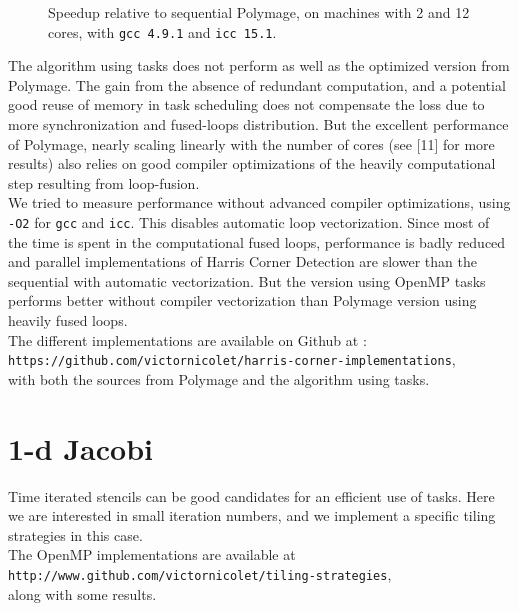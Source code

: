 \documentclass[a4paper,11pt]{article}
\begin{document}
\begin{figure}[h]
  \begin{center}
    
  \end{center}
  \caption{Speedup relative to sequential Polymage, on machines with 2 and 12 cores,
with \texttt{gcc 4.9.1} and \texttt{icc 15.1}.}
  \label{results_hcd}
\end{figure}

The algorithm using tasks does not perform as well as the optimized version from Polymage. 
The gain from the absence of redundant computation, and a potential good reuse
of memory in task scheduling does not compensate the loss due to more synchronization
and fused-loops distribution. But the excellent performance of Polymage, nearly scaling
linearly with the number of cores (see [11] for more results) also relies on good compiler
optimizations of the heavily computational step resulting from loop-fusion.\\
We tried to measure performance without advanced compiler optimizations, using \texttt{-O2} for
\texttt{gcc} and \texttt{icc}. This disables automatic loop vectorization. Since most of the time 
is spent in the computational fused loops, performance is badly reduced and parallel implementations
of Harris Corner Detection are slower than the sequential with automatic vectorization. 
But the version using OpenMP tasks performs better without compiler vectorization than
Polymage version using heavily fused loops. \\
The different implementations are available on Github at :\\
\texttt{https://github.com/victornicolet/harris-corner-implementations},\\
with both the sources from Polymage and the algorithm using tasks.



\section{1-d Jacobi}
Time iterated stencils can be good candidates for an efficient use of tasks. Here we are
interested in small iteration numbers, and we implement a specific tiling strategies in this
case. \\
The OpenMP implementations are available at \\
\texttt{http://www.github.com/victornicolet/tiling-strategies},\\
along with some results.
\end{document}
